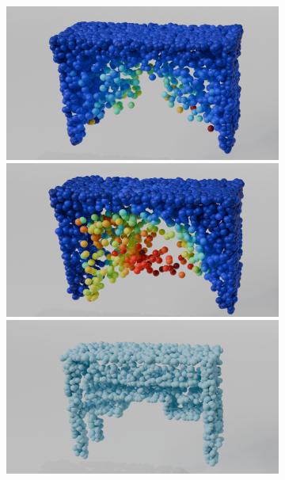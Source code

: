 \begin{figure}[htb]
\begin{subfigure}[t]{\textwidth+20pt\relax}
            \includegraphics[width=\dimexpr\linewidth-20pt\relax]{figures/ens_lin_t1.png}
            \includegraphics[width=\dimexpr\linewidth-20pt\relax]{figures/iml_lin_t1.png}
            \includegraphics[width=\dimexpr\linewidth-20pt\relax]{figures/com_t1.png}

\end{subfigure}
\end{figure}
